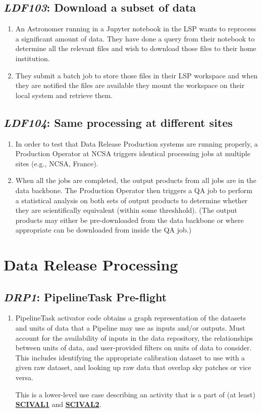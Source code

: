 \documentclass[DM,toc,lsstdraft]{lsstdoc}
\newcommand{\usecase}[3]{%
\subsection{\emph{#1}: #2}
\label{use:#1}
\begin{enumerate}[label=\alph*.]
#3
\end{enumerate}
}
\newcommand{\useref}[1]{\hyperref[use:#1]{\textcolor{lsstblue}{\textbf{#1}}}}
\begin{document}
\usecase{LDF103}{Download a subset of data}{%

\item
An Astronomer running in a Jupyter notebook in the LSP wants to reprocess a significant amount of data.
They have done a query from their notebook to determine all the relevant files and wish to download those files to their home institution.

\item
They submit a batch job to store those files in their LSP workspace and when they are notified the files are available they mount the workspace on their local system and retrieve them.

}

\usecase{LDF104}{Same processing at different sites}{%

\item
In order to test that Data Release Production systems are running properly, a Production Operator at NCSA triggers identical processing jobs at multiple sites (e.g., NCSA, France).

\item
When all the jobs are completed, the output products from all jobs are in the data backbone.
The Production Operator then triggers a QA job to perform a statistical analysis on both sets of output products to determine whether they are scientifically equivalent (within some threshhold).
(The output products may either be pre-downloaded from the data backbone or where appropriate can be downloaded from inside the QA job.)

}

\section{Data Release Processing}

\usecase{DRP1}{PipelineTask Pre-flight}{%

\item
PipelineTask activator code obtains a graph representation of the datasets and units of data that a Pipeline may use as inputs and/or outputs.
Must account for the availability of inputs in the data repository, the relationships between units of data, and user-provided filters on units of data to consider.
This includes identifying the appropriate calibration dataset to use with a given raw dataset, and looking up raw data that overlap sky patches or vice versa.

This is a lower-level use case describing an activity that is a part of (at least) \useref{SCIVAL1} and \useref{SCIVAL2}.

}
\end{document}
